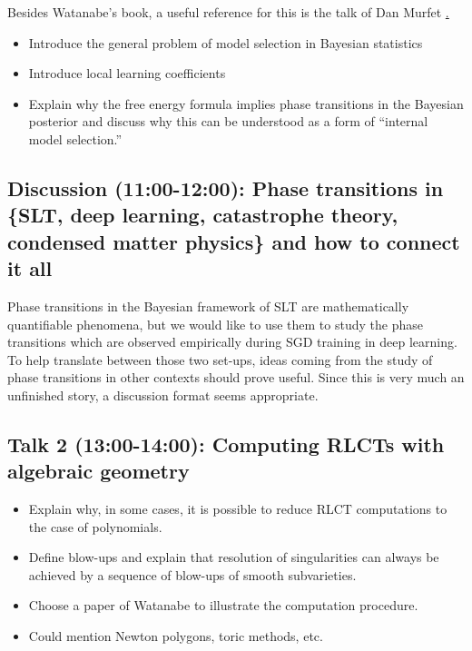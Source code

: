 \documentclass[a4paper,11pt]{amsart}
\begin{document}
Besides Watanabe's book, a useful reference for this is the talk of Dan Murfet \href{https://www.youtube.com/watch?v=UBY7xc1LZ6E&t=4364s}.

\begin{itemize}
\item Introduce the general problem of model selection in Bayesian statistics \cite[\S 8.1]{green-book}
\item Introduce local learning coefficients \cite{lambdahat}
\item Explain why the free energy formula implies phase transitions in the Bayesian posterior and discuss why this can be understood as a form of ``internal model selection.''\cite[\S 7.6]{grey-book} \cite[\S 9.4]{green-book}

\end{itemize}

\subsection*{Discussion (11:00-12:00): Phase transitions in \{SLT, deep learning, catastrophe theory, condensed matter physics\} and how to connect it all}

Phase transitions in the Bayesian framework of SLT are mathematically quantifiable phenomena, but we would like to use them to study the phase transitions which are observed empirically during SGD training in deep learning. To help translate between those two set-ups, ideas coming from the study of phase transitions in other contexts should prove useful. Since this is very much an unfinished story, a discussion format seems appropriate.

\subsection*{Talk 2 (13:00-14:00): Computing RLCTs with algebraic geometry}

\begin{itemize}
\item Explain why, in some cases, it is possible to reduce RLCT computations to the case of polynomials.
\item Define blow-ups and explain that resolution of singularities can always be achieved by a sequence of blow-ups of smooth subvarieties.  
\item Choose a paper of Watanabe to illustrate the computation procedure.
\item Could mention Newton polygons, toric methods, etc.
\end{itemize}
\end{document}
